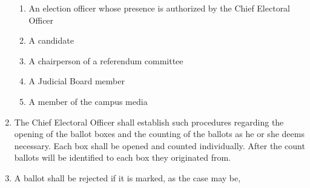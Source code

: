 \documentclass[oneside]{book}
\begin{document}
\begin{enumerate}
\begin{enumerate}
\item An election officer whose presence is authorized by the Chief Electoral
Officer 
\item A candidate 
\item A chairperson of a referendum committee 
\item A Judicial Board member 
\item A member of the campus media 
\end{enumerate}
\item The Chief Electoral Officer shall establish such procedures regarding
the opening of the ballot boxes and the counting of the ballots as
he or she deems necessary. Each box shall be opened and counted individually.
After the count ballots will be identified to each box they originated
from. 
\item A ballot shall be rejected if it is marked, as the case may be, 


\end{enumerate}
\end{document}
